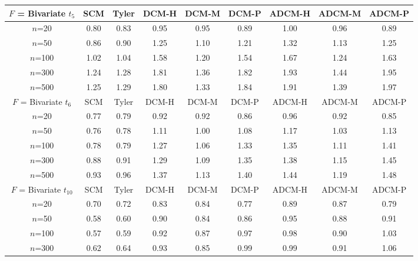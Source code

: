 \begin{table}[t]
\begin{scriptsize}
    \begin{tabular}{c|cc|ccc|ccc}
    \hline
    $F$ = Bivariate $t_5$    & SCM  & Tyler & DCM-H & DCM-M & DCM-P & ADCM-H & ADCM-M & ADCM-P \\ \hline
    $n$=20                   & 0.80 & 0.83  & 0.95   & 0.95   & 0.89  & 1.00    & 0.96    & 0.89   \\
    $n$=50                   & 0.86 & 0.90  & 1.25   & 1.10   & 1.21  & 1.32    & 1.13    & 1.25   \\
    $n$=100                  & 1.02 & 1.04  & 1.58   & 1.20   & 1.54  & 1.67    & 1.24    & 1.63   \\
    $n$=300                  & 1.24 & 1.28  & 1.81   & 1.36   & 1.82  & 1.93    & 1.44    & 1.95   \\
    $n$=500                  & 1.25 & 1.29  & 1.80   & 1.33   & 1.84  & 1.91    & 1.39    & 1.97   \\ \hline
    $F$ = Bivariate $t_6$    & SCM  & Tyler & DCM-H & DCM-M & DCM-P & ADCM-H & ADCM-M & ADCM-P \\ \hline
    $n$=20                   & 0.77 & 0.79  & 0.92   & 0.92   & 0.86  & 0.96    & 0.92    & 0.85   \\
    $n$=50                   & 0.76 & 0.78  & 1.11   & 1.00   & 1.08  & 1.17    & 1.03    & 1.13   \\
    $n$=100                  & 0.78 & 0.79  & 1.27   & 1.06   & 1.33  & 1.35    & 1.11    & 1.41   \\
    $n$=300                  & 0.88 & 0.91  & 1.29   & 1.09   & 1.35  & 1.38    & 1.15    & 1.45   \\
    $n$=500                  & 0.93 & 0.96  & 1.37   & 1.13   & 1.40  & 1.44    & 1.19    & 1.48   \\ \hline
    $F$ = Bivariate $t_{10}$ & SCM  & Tyler & DCM-H & DCM-M & DCM-P & ADCM-H & ADCM-M & ADCM-P \\ \hline
    $n$=20                   & 0.70 & 0.72  & 0.83   & 0.84   & 0.77  & 0.89    & 0.87    & 0.79   \\
    $n$=50                   & 0.58 & 0.60  & 0.90   & 0.84   & 0.86  & 0.95    & 0.88    & 0.91   \\
    $n$=100                  & 0.57 & 0.59  & 0.92   & 0.87   & 0.97  & 0.98    & 0.90    & 1.03   \\
    $n$=300                  & 0.62 & 0.64  & 0.93   & 0.85   & 0.99  & 0.99    & 0.91    & 1.06   \\

\end{tabular}
\end{scriptsize}
\end{table}
